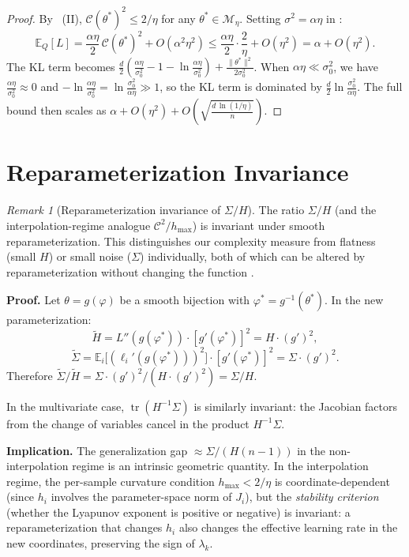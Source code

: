 \documentclass[11pt,a4paper]{article}
\theoremstyle{definition}
\theoremstyle{remark}
\newtheorem{remark}[theorem]{Remark}
\DeclareMathOperator{\tr}{tr}
\newcommand{\E}{\mathbb{E}}
\newcommand{\cM}{\mathcal{M}}
\newcommand{\cC}{\mathcal{C}}
\begin{document}
\begin{proof}
By ~(II), $\cC(\theta^*)^2 \leq 2/\eta$ for any
$\theta^* \in \cM_\eta$.  Setting $\sigma^2 = \alpha\eta$ in :
\[
  \E_Q[L]
  = \frac{\alpha\eta}{2}\,\cC(\theta^*)^2 + O(\alpha^2 \eta^2)
  \leq \frac{\alpha\eta}{2} \cdot \frac{2}{\eta} + O(\eta^2)
  = \alpha + O(\eta^2).
\]
The KL term becomes
$\frac{d}{2}\!\left(\frac{\alpha\eta}{\sigma_0^2} - 1
- \ln\frac{\alpha\eta}{\sigma_0^2}\right) + \frac{\|\theta^*\|^2}{2\sigma_0^2}$.
When $\alpha\eta \ll \sigma_0^2$, we have
$\frac{\alpha\eta}{\sigma_0^2} \approx 0$ and
$-\ln\frac{\alpha\eta}{\sigma_0^2} = \ln\frac{\sigma_0^2}{\alpha\eta} \gg 1$,
so the KL term is dominated by $\frac{d}{2}\ln\frac{\sigma_0^2}{\alpha\eta}$.
The full bound then scales as
$\alpha + O(\eta^2) + O\!\left(\sqrt{\frac{d\,\ln(1/\eta)}{n}}\right)$.
\end{proof}

\section{Reparameterization Invariance}\label{sec:reparam}

\begin{remark}[Reparameterization invariance of $\Sigma/H$]\label{rem:reparam}
  The ratio $\Sigma/H$ (and the interpolation-regime analogue $\cC^2/h_{\max}$)
  is invariant under smooth reparameterization.  This distinguishes our complexity
  measure from flatness (small $H$) or small noise ($\Sigma$) individually, both of
  which can be altered by reparameterization without changing the function
  \cite{Dinh2017}.

  \textbf{Proof.}\;
  Let $\theta = g(\varphi)$ be a smooth bijection with $\varphi^* = g^{-1}(\theta^*)$.
  In the new parameterization:
  \[
    \tilde{H} = L''(g(\varphi^*)) \cdot [g'(\varphi^*)]^2 = H \cdot (g')^2,
  \]
  \[
    \tilde{\Sigma}
    = \E_i\!\bigl[(\ell_i'(g(\varphi^*)))^2\bigr] \cdot [g'(\varphi^*)]^2
    = \Sigma \cdot (g')^2.
  \]
  Therefore $\tilde{\Sigma}/\tilde{H} = \Sigma \cdot (g')^2 / (H \cdot (g')^2)
  = \Sigma / H$.

  In the multivariate case, $\tr(H^{-1}\Sigma)$ is similarly invariant: the Jacobian
  factors from the change of variables cancel in the product $H^{-1}\Sigma$.

  \textbf{Implication.}\;
  The generalization gap $\approx \Sigma/(H(n-1))$ in the non-interpolation regime is
  an intrinsic geometric quantity.  In the interpolation regime, the per-sample
  curvature condition $h_{\max} < 2/\eta$ is coordinate-dependent (since $h_i$ involves
  the parameter-space norm of $J_i$), but the \emph{stability criterion} (whether
  the Lyapunov exponent is positive or negative) is invariant: a reparameterization
  that changes $h_i$ also changes the effective learning rate in the new coordinates,
  preserving the sign of $\lambda_k$.
\end{remark}
\end{document}
